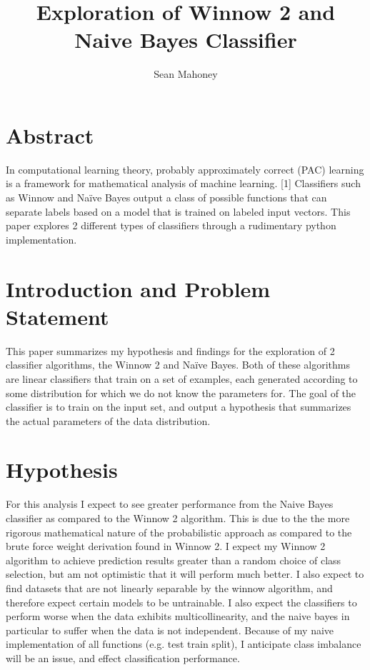 \documentclass[11pt]{article}
\begin{document}
  \nocite{*}
  \author{Sean Mahoney}
  \title{Exploration of Winnow 2 and Naive Bayes Classifier}
  \maketitle

\section{Abstract}

In computational learning theory, probably approximately correct (PAC) learning is a framework for mathematical analysis of machine learning. [1] Classifiers such as Winnow and Naïve Bayes output a class of possible functions that can separate labels based on a model that is trained on labeled input vectors.  This paper explores 2 different types of classifiers through a rudimentary python implementation. 


\section{Introduction and Problem Statement}
This paper summarizes my hypothesis and findings for the exploration of 2 classifier algorithms, the Winnow 2 and Naïve Bayes. Both of these algorithms are linear classifiers that train on a set of examples, each generated according to some distribution for which we do not know the parameters for. The goal of the classifier is to train on the input set, and output a hypothesis that summarizes the actual parameters of the data distribution. 

\section{Hypothesis}
For this analysis I expect to see greater performance from the Naive Bayes classifier as compared to the Winnow 2 algorithm. This is due to the the more rigorous mathematical nature of the probabilistic approach as compared to the brute force weight derivation found in Winnow 2. I expect my Winnow 2 algorithm to achieve prediction results greater than a random choice of class selection, but am not optimistic that it will perform much better. I also expect to find datasets that are not linearly separable by the winnow algorithm, and therefore expect certain models to be untrainable. I also expect the classifiers to perform worse when the data exhibits multicollinearity, and the naive bayes in particular to suffer when the data is not independent. Because of my naive implementation of all functions (e.g. test train split), I anticipate class imbalance will be an issue, and effect classification performance. 
\end{document}
